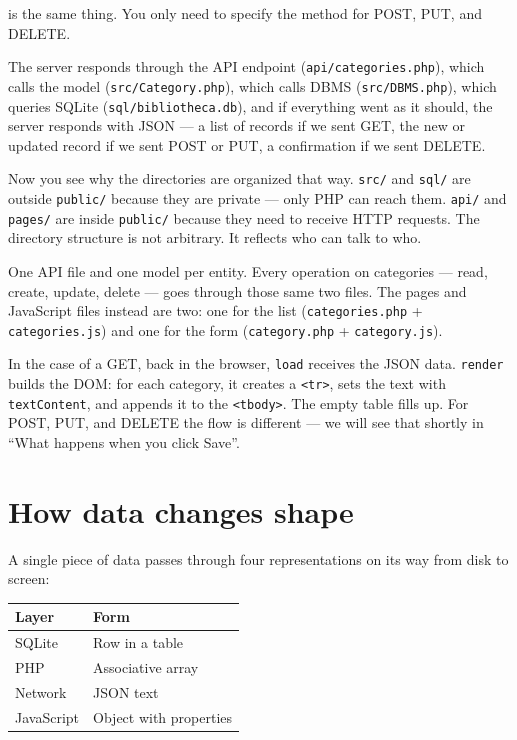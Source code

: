 \documentclass[11pt,a4paper,oneside]{book}
\begin{document}
is the same thing. You only need to specify the method for POST,
PUT, and DELETE.

The server responds through the API endpoint
(\texttt{api/categories.php}), which calls the model
(\texttt{src/Category.php}), which calls DBMS
(\texttt{src/DBMS.php}), which queries SQLite
(\texttt{sql/bibliotheca.db}), and if everything went as it
should, the server responds with JSON --- a list of records if we
sent GET, the new or updated record if we sent POST or PUT, a
confirmation if we sent DELETE.

Now you see why the directories are organized that way.
\texttt{src/} and \texttt{sql/} are outside \texttt{public/}
because they are private --- only PHP can reach them.
\texttt{api/} and \texttt{pages/} are inside \texttt{public/}
because they need to receive HTTP requests. The directory
structure is not arbitrary. It reflects who can talk to who.

One API file and one model per entity. Every operation on
categories --- read, create, update, delete --- goes through
those same two files. The pages and JavaScript files instead are
two: one for the list (\texttt{categories.php} +
\texttt{categories.js}) and one for the form
(\texttt{category.php} + \texttt{category.js}).

In the case of a GET, back in the browser, \texttt{load} receives
the JSON data. \texttt{render} builds the DOM: for each category,
it creates a \texttt{\textless{}tr\textgreater{}}, sets the text
with \texttt{textContent}, and appends it to the
\texttt{\textless{}tbody\textgreater{}}. The empty table fills
up. For POST, PUT, and DELETE the flow is different --- we will
see that shortly in ``What happens when you click Save''.

\hypertarget{how-data-changes-shape}{%
\section{How data changes shape}\label{how-data-changes-shape}}

A single piece of data passes through four representations on its
way from disk to screen:

\begin{longtable}[]{@{}ll@{}}
\toprule
Layer & Form \\
\midrule
\endhead
SQLite & Row in a table \\
PHP & Associative array \\
Network & JSON text \\
JavaScript & Object with properties \\
\bottomrule
\end{longtable}
\end{document}
